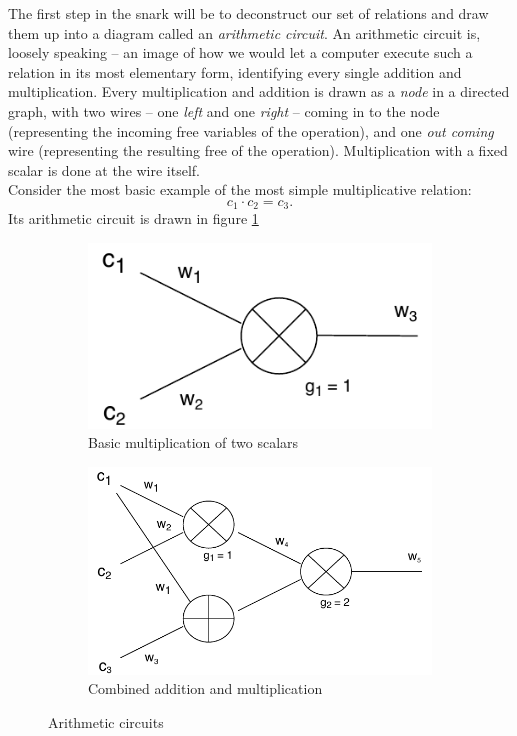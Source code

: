 \documentclass[11pt,oneside]{article}
\theoremstyle{definition}
\theoremstyle{remark}
\numberwithin{equation}{section}
\begin{document}
The first step in the snark  will be to deconstruct our set of relations and draw them up into a diagram called an \emph{arithmetic circuit}. An arithmetic circuit is, loosely speaking -- an image of how we would let a computer execute such a relation in its most elementary form, identifying every single addition and multiplication. Every multiplication and addition is drawn as a \emph{node} in a directed graph, with two wires -- one \emph{left} and one \emph{right} -- coming in to the node (representing the incoming free variables of the operation), and one \emph{out coming} wire (representing the resulting free of the operation). Multiplication with a fixed scalar is done at the wire itself.\\
Consider the most basic example of the most simple multiplicative relation:
$$c_1\cdot c_2=c_3.$$
Its arithmetic circuit is drawn in figure \ref{fig:arith:basic}
\begin{figure}[h]
		\begin{center}
			\vspace{3pt}
	\begin{subfigure}[b]{0.35\textwidth}
		\includegraphics[width=\textwidth]{arith_circ/basic1.pdf}
		\caption{Basic multiplication of two scalars}
		\label{fig:arith:basic}
	\end{subfigure}
\hspace{1cm}
	\begin{subfigure}[b]{0.4\textwidth}
		\includegraphics[width=\textwidth]{arith_circ/add_mult.pdf}
		\caption{Combined addition and multiplication}
		\label{fig:arith:add_mult}
	\end{subfigure}
\caption{Arithmetic circuits}
\end{center}
\end{figure}
\end{document}
